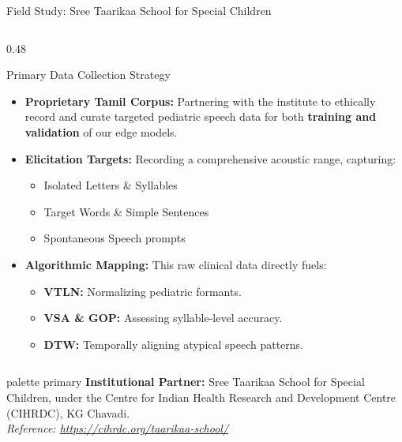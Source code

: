\documentclass[aspectratio=169, 11pt, xcolor=table]{beamer}
\begin{document}
\begin{frame}{Field Study: Sree Taarikaa School for Special Children}
\begin{columns}[T, totalwidth=\textwidth]
        \begin{column}{0.48\textwidth}
            \begin{block}{Primary Data Collection Strategy}
                \tiny
                \begin{itemize}
                    \setlength{\itemsep}{3pt}
                    \item \textbf{Proprietary Tamil Corpus:} Partnering with the institute to ethically record and curate targeted pediatric speech data for both \textbf{training and validation} of our edge models.
                    \item \textbf{Elicitation Targets:} Recording a comprehensive acoustic range, capturing:
                        \begin{itemize}
                            \tiny
                            \item Isolated Letters \& Syllables
                            \item Target Words \& Simple Sentences
                            \item Spontaneous Speech prompts
                        \end{itemize}
                    \item \textbf{Algorithmic Mapping:} This raw clinical data directly fuels:
                        \begin{itemize}
                            \tiny
                            \item \textbf{VTLN:} Normalizing pediatric formants.
                            \item \textbf{VSA \& GOP:} Assessing syllable-level accuracy.
                            \item \textbf{DTW:} Temporally aligning atypical speech patterns.
                        \end{itemize}
                \end{itemize}
            \end{block}
        \end{column}
    \end{columns}

    \vspace{2mm}
    \begin{beamercolorbox}[sep=3pt, center, rounded=true]{palette primary}
        \tiny \textbf{Institutional Partner:} Sree Taarikaa School for Special Children, under the Centre for Indian Health Research and Development Centre (CIHRDC), KG Chavadi.\\
        \textit{Reference: \url{https://cihrdc.org/taarikaa-school/}}
    \end{beamercolorbox}
\end{frame}
\end{document}
